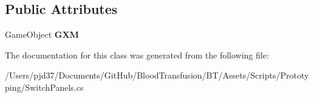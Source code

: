 \subsection*{Public Attributes}
\begin{DoxyCompactItemize}
\item 
Game\+Object {\bfseries G\+XM}\hypertarget{class_switch_panels_aab4bf7c507fb2b45161ab661c4a47072}{}\label{class_switch_panels_aab4bf7c507fb2b45161ab661c4a47072}

\end{DoxyCompactItemize}


The documentation for this class was generated from the following file\+:\begin{DoxyCompactItemize}
\item 
/\+Users/pjd37/\+Documents/\+Git\+Hub/\+Blood\+Transfusion/\+B\+T/\+Assets/\+Scripts/\+Prototyping/Switch\+Panels.\+cs\end{DoxyCompactItemize}
